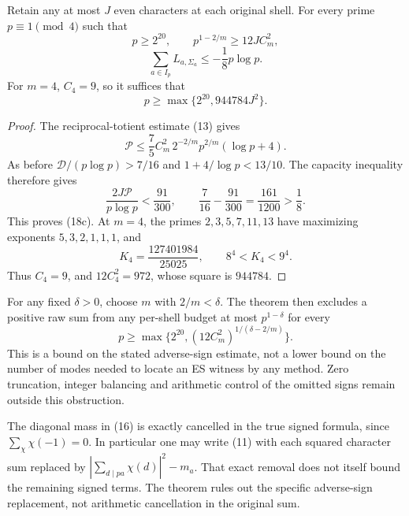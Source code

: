\begin{theorem}\label{thm:sublinear}
Retain any at most $J$ even characters at each original shell. For every prime
$p\equiv1\pmod4$ such that
\[
 p\ge2^{20},\qquad p^{1-2/m}\ge12JC_m^2,
\]
\[
 \boxed{\sum_{a\in I_p}L_{a,\Sigma_a}\le-\frac18p\log p.} \tag{18c}
\]
For $m=4$, $C_4=9$, so it suffices that
\[
 \boxed{p\ge\max\{2^{20},944784J^2\}.}                 \tag{18d}
\]
\end{theorem}
\begin{proof}
The reciprocal-totient estimate (13) gives
\[
 \mathcal P\le\frac75 C_m^2\,2^{-2/m}p^{2/m}(\log p+4).
\]
As before $\mathcal D/(p\log p)>7/16$ and
$1+4/\log p<13/10$. The capacity inequality therefore gives
\[
 \frac{2J\mathcal P}{p\log p}<\frac{91}{300},\qquad
 \frac7{16}-\frac{91}{300}=\frac{161}{1200}>\frac18.
\]
This proves (18c). At $m=4$, the primes $2,3,5,7,11,13$ have maximizing
exponents $5,3,2,1,1,1$, and
\[
 K_4=\frac{127401984}{25025},\qquad8^4<K_4<9^4.
\]
Thus $C_4=9$, and $12C_4^2=972$, whose square is $944784$.
\end{proof}
For any fixed $\delta>0$, choose $m$ with $2/m<\delta$. The theorem then
excludes a positive raw sum from any per-shell budget at most $p^{1-\delta}$
for every
\[
 p\ge\max\{2^{20},(12C_m^2)^{1/(\delta-2/m)}\}.
\]
This is a bound on the stated adverse-sign estimate, not a lower bound on the
number of modes needed to locate an ES witness by any method. Zero truncation,
integer balancing and arithmetic control of the omitted signs remain outside
this obstruction.

The diagonal mass in (16) is exactly cancelled in the true signed formula,
since $\sum_\chi\chi(-1)=0$. In particular one may write (11) with each squared
character sum replaced by $|\sum_{d\mid pa}\chi(d)|^2-m_a$. That exact removal
does not itself bound the remaining signed terms. The theorem rules out the
specific adverse-sign replacement, not arithmetic cancellation in the original sum.

